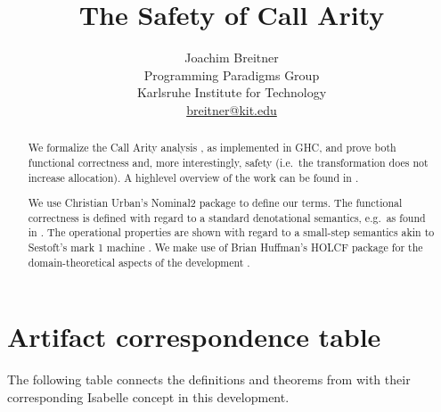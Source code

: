 \documentclass[11pt,a4paper,parskip=half]{scrartcl}
\begin{document}
\title{The Safety of Call Arity}
\author{Joachim Breitner\\
Programming Paradigms Group\\
Karlsruhe Institute for Technology\\
\url{breitner@kit.edu}}
\maketitle


\begin{abstract}
We formalize the Call Arity analysis \cite{tfp}, as implemented in GHC, and prove both functional correctness and, more interestingly, safety (i.e.\ the transformation does not increase allocation). A highlevel overview of the work can be found in \cite{icfp15}.

We use Christian Urban's Nominal2 package \cite{nominal} to define our terms. The functional correctness is defined with regard to a standard denotational semantics, e.g.\ as found in \cite{launchbury}. The operational properties are shown with regard to a small-step semantics akin to Sestoft's mark 1 machine \cite{sestoft}.  We make use of Brian Huffman's HOLCF package for the domain-theoretical aspects of the development \cite{holcf}.

\end{abstract}

\section*{Artifact correspondence table}
\label{sec:table}

The following table connects the definitions and theorems from \cite{icfp15} with their corresponding Isabelle concept in this development. 

\newcommand{\seetheory}[1]{\hyperref[sec_#1]{#1}}
\end{document}
